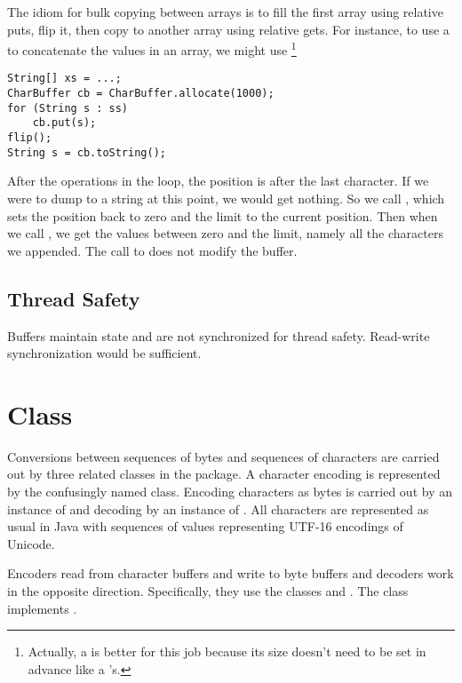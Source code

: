 The idiom for bulk copying between arrays is to fill the first array
using relative puts, flip it, then copy to another array using
relative gets.  For instance, to use a  to concatenate
the values in an array, we might use%
%
\footnote{Actually, a  is better for this job
because its size doesn't need to be set in advance like a
's.}%
%
\begin{verbatim}
String[] xs = ...;
CharBuffer cb = CharBuffer.allocate(1000);
for (String s : ss)
    cb.put(s);
flip();
String s = cb.toString();
\end{verbatim}
%
After the  operations in the loop, the position is
after the last character.  If we were to dump to a string at this
point, we would get nothing.  So we call , which
sets the position back to zero and the limit to the current
position.  Then when we call , we get the values
between zero and the limit, namely all the characters we appended.
The call to  does not modify the buffer.







 






\subsection{Thread Safety}

Buffers maintain state and are not synchronized for thread safety.
Read-write synchronization would be sufficient.



\section{ Class}

Conversions between sequences of bytes and sequences of characters are
carried out by three related classes in the 
package.  A character encoding is represented by the confusingly named
 class.  Encoding characters as bytes is carried out by
an instance of  and decoding by an instance of
.  All characters are represented as usual in
Java with sequences of  values representing UTF-16
encodings of Unicode.

Encoders read from character buffers and write to byte buffers and
decoders work in the opposite direction.  Specifically, they use the
 classes  and .  The
class  implements .

